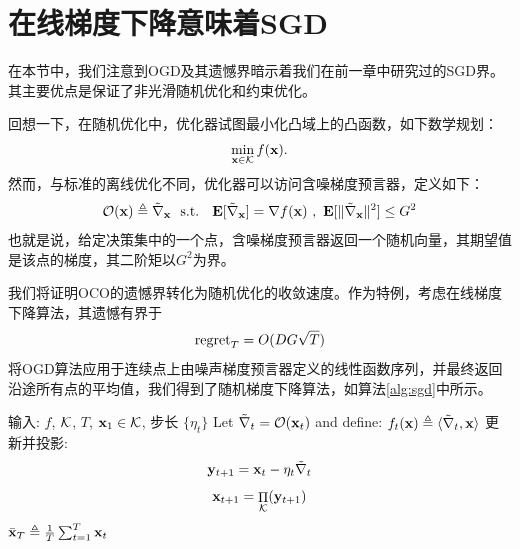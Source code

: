 \section{
	在线梯度下降意味着SGD
	}

在本节中，我们注意到OGD及其遗憾界暗示着我们在前一章中研究过的SGD界。其主要优点是保证了非光滑随机优化和约束优化。

回想一下，在随机优化中，优化器试图最小化凸域上的凸函数，如下数学规划：
\begin{align*}
\min_{\mathbf x \in \mathcal K } f(\mathbf x). 
\end{align*}
然而，与标准的离线优化不同，优化器可以访问含噪梯度预言器，定义如下：
$$ \mathcal{O}(\mathbf x) \triangleq \tilde{\nabla }_{\mathbf x}  \ \mbox{ s.t. } \  \mathop{\mbox{\bf E}}[\tilde{\nabla }_{\mathbf x} ] = \nabla f(\mathbf x) \ , \   \mathop{\mbox{\bf E}}[ \|\tilde{\nabla }_{\mathbf x}\|^2 ] \leq G^2  $$
也就是说，给定决策集中的一个点，含噪梯度预言器返回一个随机向量，其期望值是该点的梯度，其二阶矩以$G^2$为界。
	
我们将证明OCO的遗憾界转化为随机优化的收敛速度。作为特例，考虑在线梯度下降算法，其遗憾有界于
$$\mathrm{{regret}}_{T} = O(DG\sqrt{T}) $$
将OGD算法应用于连续点上由噪声梯度预言器定义的线性函数序列，并最终返回沿途所有点的平均值，我们得到了随机梯度下降算法，如算法\ref{alg:sgd}中所示。
\begin{algorithm}[h!]
\caption{
随机梯度下降
}
\label{alg:sgd}
\begin{algorithmic}[1]
\STATE 输入: $f$, $\mathcal K$, $T$, $\mathbf x_1 \in \mathcal{K}$, 步长 $\{ \eta_t \}$
\STATE \label{alg:sgd-defnft} Let $\tilde{\nabla}_t = \mathcal{O}(\mathbf x_t)$ and define: $ f_t(\mathbf x) \triangleq  \langle \tilde{\nabla}_t , \mathbf x \rangle $ 
\STATE 更新并投影:
$$ \mathbf y_{t+1} = \mathbf{x}_{t}-\eta_t \tilde{\nabla}_t$$
$$ \mathbf{x}_{t+1} = \mathop{\Pi}_{\mathcal K}(\mathbf y_{t+1})$$
\ENDFOR
\RETURN $\bar{\mathbf x}_T \triangleq \frac{1}{T} \sum_{t=1}^T \mathbf x_t$ 
\end{algorithmic}
\end{algorithm}
	

